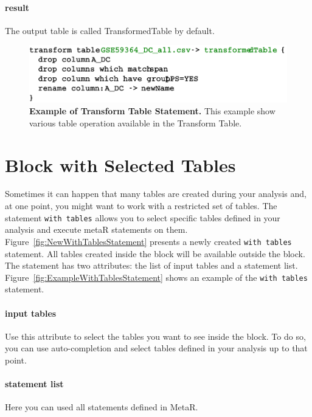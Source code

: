 \paragraph{result}
The output table is called TransformedTable by default. 


\begin{figure}
  \centering
  \includegraphics[width=\figWidthNarrow]{figures/TransformTable.pdf}
\caption[Transform Table  Statement.]{\textbf{Example of Transform Table Statement.} This example show various table operation available in  the Transform Table.}
\label{fig:TransformTable}
\end{figure}

\section{Block with Selected Tables}
Sometimes it can happen that many tables are created during your analysis and, at one point, you might want to work with a restricted set of tables.
The statement \texttt{with tables} allows you to select specific tables defined in your analysis and execute metaR statements on them.
Figure~\ref{fig:NewWithTablesStatement} presents a newly created \texttt{with tables} statement. All tables created inside the block will be available outside the block.
The statement has two attributes: the list of input tables and a statement list. Figure~\ref{fig:ExampleWithTablesStatement} shows an example of the \texttt{with tables} statement.

\paragraph{input tables}
Use this attribute to select the tables you want to see inside the block. To do so, you can use auto-completion and select tables defined in your analysis up to that point.

\paragraph{statement list}
Here you can used all statements defined in MetaR.
 
